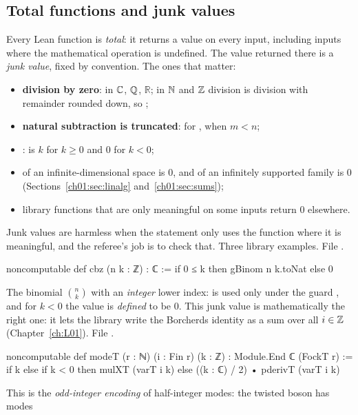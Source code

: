 \subsection{Total functions and junk values}\label{ch01:sec:junk}

Every Lean function is \emph{total}: it returns a value on every input, including inputs where the
mathematical operation is undefined. The value returned there is a \emph{junk value}, fixed by
convention. The ones that matter:
\begin{itemize}
\item \textbf{division by zero}:  in ${\mathbb{C}}$, ${\mathbb{Q}}$, $\mathbb R$; in ${\mathbb{N}}$ and ${\mathbb{Z}}$
  division is division with remainder rounded down, so ;
\item \textbf{natural subtraction is truncated}: for ,  when $m<n$;
\item {}:  is $k$ for $k\ge0$ and $0$ for $k<0$;
\item {} of an infinite-dimensional space is $0$, and  of an infinitely
  supported family is $0$ (Sections~\ref{ch01:sec:linalg} and~\ref{ch01:sec:sums});
\item library functions that are only meaningful on some inputs return $0$ elsewhere.
\end{itemize}
Junk values are harmless when the statement only uses the function where it is meaningful, and
the referee's job is to check that. Three library examples.
\noindent File .
\begin{leancode}
noncomputable def cbz (n k : ℤ) : ℂ := if 0 ≤ k then gBinom n k.toNat else 0
\end{leancode}
The binomial $\binom nk$ with an \emph{integer} lower index:  is used only under the
guard , and for $k<0$ the value is \emph{defined} to be $0$. This junk value is
mathematically the right one: it lets the library write the Borcherds identity as a sum over all
$i\in{\mathbb{Z}}$ (Chapter~\ref{ch:L01}).
\noindent File .
\begin{leancode}
noncomputable def modeT (r : ℕ) (i : Fin r) (k : ℤ) : Module.End ℂ (FockT r) :=
  if k %
  else if k < 0 then mulXT (varT i k)
  else ((k : ℂ) / 2) • pderivT (varT i k)
\end{leancode}
This is the \emph{odd-integer encoding} of half-integer modes: the twisted boson has modes
